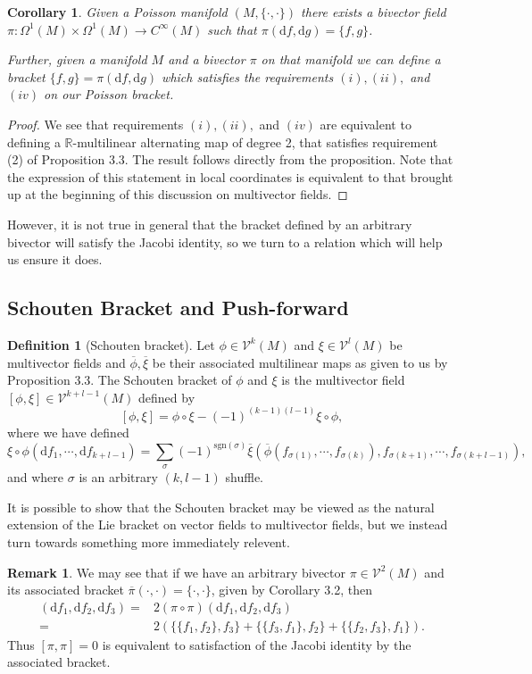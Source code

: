 \documentclass[psamsfonts,12pt]{amsart}
\newcommand\td{\mathrm{d}}
\newcommand\0{\mathbf{0}}
\theoremstyle{plain}
\newtheorem{cor}[thm]{Corollary}
\theoremstyle{definition}
\newtheorem{dfn}[thm]{Definition} %
\newtheorem{rmk}[thm]{Remark}
\newcommand{\bbR}{\mathbb{R}}
\newcommand{\sV}{\mathcal{V}}
\begin{document}
\begin{cor}
Given a Poisson manifold $(M,\{\cdot,\cdot\})$ there exists a bivector field $\pi\colon \Omega^1(M)\times \Omega^1(M)\rightarrow C^\infty(M)$ such that $\pi(\td f,\td g)=\{f,g\}$.  

Further, given a manifold $M$ and a bivector $\pi$ on that manifold we can define a bracket $\{f,g\}=\pi(\td f,\td g)$ which satisfies the requirements $(i), (ii),$ and $(iv)$ on our Poisson bracket.
\end{cor}
\begin{proof}
We see that requirements $(i), (ii),$ and $(iv)$ are equivalent to defining a $\bbR$-multilinear alternating map of degree 2, that satisfies requirement (2) of Proposition 3.3.  The result follows directly from the proposition.  Note that the expression of this statement in local coordinates is equivalent to that brought up at the beginning of this discussion on multivector fields.
\end{proof}

However, it is not true in general that the bracket defined by an arbitrary bivector will satisfy the Jacobi identity, so we turn to a relation which will help us ensure it does.

\subsection{Schouten Bracket and Push-forward}

\begin{dfn}[Schouten bracket]
Let $\phi \in \sV^k(M)$ and $\xi\in \sV^l(M)$ be multivector fields and $\overline{\phi}, \overline{\xi}$ be their associated multilinear maps as given to us by Proposition 3.3.  The Schouten bracket of $\phi$ and $\xi$ is the multivector field $[\phi,\xi]\in \sV^{k+l-1}(M)$ defined by
\[
[\phi,\xi]=\phi \circ \xi -(-1)^{(k-1)(l-1)}\xi \circ \phi,
\]
where we have defined
\[
\xi\circ \phi (\td f_1,\cdots, \td f_{k+l-1}) = \sum_\sigma (-1)^{\text{sgn}(\sigma)} \overline{\xi}\left( \overline{\phi} ( f_{\sigma(1)},\cdots, f_{\sigma(k)}),f_{\sigma(k+1)},\cdots, f_{\sigma(k+l-1)}\right),
\]
and where $\sigma$ is an arbitrary $(k,l-1)$ shuffle.
\end{dfn}

It is possible to show that the Schouten bracket may be viewed as the natural extension of the Lie bracket on vector fields to multivector fields, but we instead turn towards something more immediately relevent.

\begin{rmk}
We may see that if we have an arbitrary bivector $\pi \in \sV^2(M)$ and its associated bracket $\overline{\pi}(\cdot,\cdot)=\{\cdot,\cdot \}$, given by Corollary 3.2, then 
\begin{align*}
[\pi,\pi](\td f_1,\td f_2,\td f_3)=& 2(\pi \circ \pi)(\td f_1,\td f_2, \td f_3)\\
=& 2\left(\{ \{f_1,f_2\},f_3\}+ \{\{f_3,f_1\},f_2\}+\{\{f_2,f_3\},f_1\}\right).
\end{align*}
Thus $[\pi,\pi]=0$ is equivalent to satisfaction of the Jacobi identity by the associated bracket.
\end{rmk}
\end{document}
